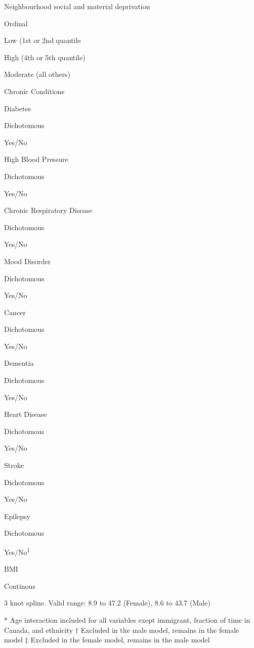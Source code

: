 \documentclass[]{book}
\begin{document}
Neighbourhood social and material deprivation

Ordinal

Low (1st or 2nd quantile

High (4th or 5th quantile)

Moderate (all others)

Chronic Conditions

Diabetes

Dichotomous

Yes/No

High Blood Pressure

Dichotomous

Yes/No

Chronic Respiratory Disease

Dichotomous

Yes/No

Mood Disorder

Dichotomous

Yes/No

Cancer

Dichotomous

Yes/No

Dementia

Dichotomous

Yes/No

Heart Disease

Dichotomous

Yes/No

Stroke

Dichotomous

Yes/No

Epilepsy

Dichotomous

Yes/No\textsuperscript{‡}

BMI

Continous

3 knot spline. Valid range: 8.9 to 47.2 (Female), 8.6 to 43.7 (Male)

* Age interaction included for all variables exept immigrant, fraction
of time in Canada, and ethnicity † Excluded in the male model, remains
in the female model ‡ Excluded in the female model, remains in the male
model


\end{document}
